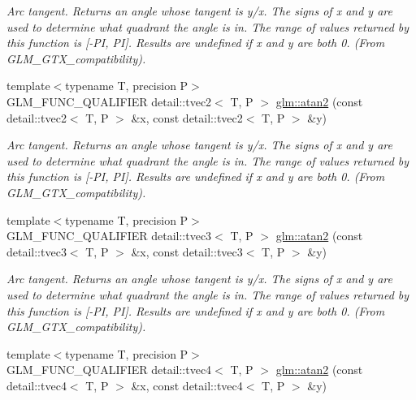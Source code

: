 \begin{CompactItemize}
\begin{CompactList}\small\item\em Arc tangent. Returns an angle whose tangent is y/x. The signs of x and y are used to determine what quadrant the angle is in. The range of values returned by this function is \mbox{[}-PI, PI\mbox{]}. Results are undefined if x and y are both 0. (From GLM\_\-GTX\_\-compatibility). \item\end{CompactList}\item 
\hypertarget{group__gtx__compatibility_g8dc4b8f0530c01b053743c0735e286ba}{
{\footnotesize template$<$typename T, precision P$>$ }\\GLM\_\-FUNC\_\-QUALIFIER detail::tvec2$<$ T, P $>$ \hyperlink{group__gtx__compatibility_g8dc4b8f0530c01b053743c0735e286ba}{glm::atan2} (const detail::tvec2$<$ T, P $>$ \&x, const detail::tvec2$<$ T, P $>$ \&y)}
\label{group__gtx__compatibility_g8dc4b8f0530c01b053743c0735e286ba}

\begin{CompactList}\small\item\em Arc tangent. Returns an angle whose tangent is y/x. The signs of x and y are used to determine what quadrant the angle is in. The range of values returned by this function is \mbox{[}-PI, PI\mbox{]}. Results are undefined if x and y are both 0. (From GLM\_\-GTX\_\-compatibility). \item\end{CompactList}\item 
\hypertarget{group__gtx__compatibility_gbff44d2ce3461c971abd56efd0dc3abb}{
{\footnotesize template$<$typename T, precision P$>$ }\\GLM\_\-FUNC\_\-QUALIFIER detail::tvec3$<$ T, P $>$ \hyperlink{group__gtx__compatibility_gbff44d2ce3461c971abd56efd0dc3abb}{glm::atan2} (const detail::tvec3$<$ T, P $>$ \&x, const detail::tvec3$<$ T, P $>$ \&y)}
\label{group__gtx__compatibility_gbff44d2ce3461c971abd56efd0dc3abb}

\begin{CompactList}\small\item\em Arc tangent. Returns an angle whose tangent is y/x. The signs of x and y are used to determine what quadrant the angle is in. The range of values returned by this function is \mbox{[}-PI, PI\mbox{]}. Results are undefined if x and y are both 0. (From GLM\_\-GTX\_\-compatibility). \item\end{CompactList}\item 
\hypertarget{group__gtx__compatibility_ga7c3a1b05bab87aa5a7cbc9efadfbc52}{
{\footnotesize template$<$typename T, precision P$>$ }\\GLM\_\-FUNC\_\-QUALIFIER detail::tvec4$<$ T, P $>$ \hyperlink{group__gtx__compatibility_ga7c3a1b05bab87aa5a7cbc9efadfbc52}{glm::atan2} (const detail::tvec4$<$ T, P $>$ \&x, const detail::tvec4$<$ T, P $>$ \&y)}
\label{group__gtx__compatibility_ga7c3a1b05bab87aa5a7cbc9efadfbc52}


\end{CompactItemize}
